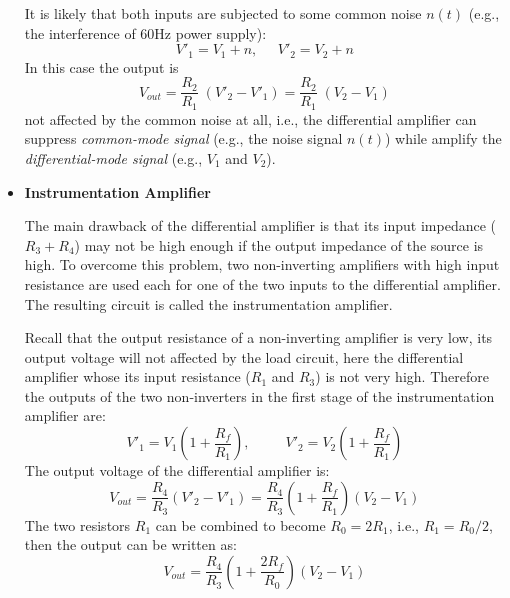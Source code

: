 \documentclass{article}
\begin{document}
\begin{itemize}
  It is likely that both inputs are subjected to some common noise
  $n(t)$ (e.g., the interference of 60Hz power supply):
  \begin{equation}
    V'_1=V_1+n, \;\;\;\;\;V'_2=V_2+n
  \end{equation}
  In this case the output is 
  \begin{equation}
    V_{out}=\frac{R_2}{R_1}\;(V'_2-V'_1)=\frac{R_2}{R_1}\;(V_2-V_1) 
  \end{equation}
  not affected by the common noise at all, i.e., the differential amplifier 
  can suppress {\em common-mode signal} (e.g., the noise signal $n(t)$)
  while amplify the {\em differential-mode signal} (e.g., $V_1$ and $V_2$).

\item {\bf Instrumentation Amplifier}


  The main drawback of the differential amplifier is that its input 
  impedance ($R_3+R_4$) may not be high enough if the output impedance 
  of the source is high. To overcome this problem, two non-inverting
  amplifiers with high input resistance are used each for one of the
  two inputs to the differential amplifier. The resulting circuit is 
  called the instrumentation amplifier.


  Recall that the output resistance of a non-inverting amplifier is 
  very low, its output voltage will not affected by the load circuit, 
  here the differential amplifier whose its input resistance ($R_1$ 
  and $R_3$) is not very high. Therefore the outputs of the two 
  non-inverters in the first stage of the instrumentation amplifier 
  are:
  \begin{equation}
    V'_1=V_1\left(1+\frac{R_f}{R_1}\right),\;\;\;\;\;\;\;\;\;
    V'_2=V_2\left(1+\frac{R_f}{R_1}\right) 
  \end{equation}
  The output voltage of the differential amplifier is:
  \begin{equation} 
    V_{out}=\frac{R_4}{R_3}(V'_2-V'_1)
    =\frac{R_4}{R_3}\left(1+\frac{R_f}{R_1}\right)(V_2-V_1) 
  \end{equation}
  The two resistors $R_1$ can be combined to become $R_0=2R_1$,
  i.e., $R_1=R_0/2$, then the output can be written as:
  \begin{equation}
    V_{out}=\frac{R_4}{R_3}\left(1+\frac{2R_f}{R_0}\right)(V_2-V_1) 
  \end{equation}


\end{itemize}
\end{document}
